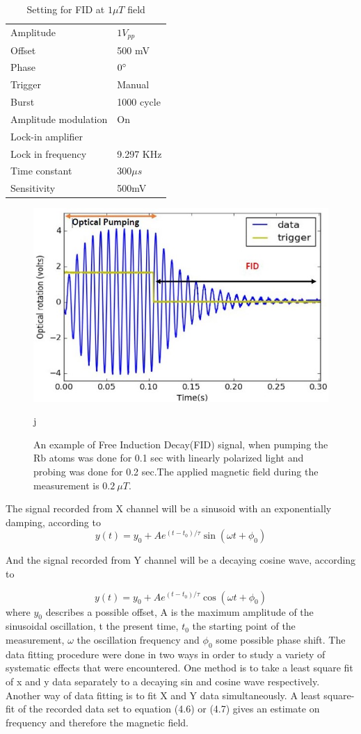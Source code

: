 \documentclass[12pt]{report}
\begin{document}
\begin{itemize}
\begin{table}[h]
\begin{tabular}{|l |l|}
Amplitude   &  $1V_{pp}$  \\
Offset  &       500 mV  \\
Phase       &    $0\degree$ \\
Trigger     &   Manual  \\
Burst       &    1000 cycle \\
Amplitude modulation & On \\
\hline
Lock-in amplifier &     \\
\hline
Lock in frequency     & 9.297 KHz \\
Time constant     &  $300\mu s$ \\
Sensitivity      &  500mV  \\
\hline
\end{tabular}
\caption{Setting for FID at $1\mu T$ field}
\end{table}
\begin{figure}[h]
\centering\includegraphics[width=0.55\linewidth]{figures/Capture2}
\caption{ An example of Free Induction Decay(FID) signal, when pumping the Rb atoms  was done for 0.1 sec with linearly polarized light and probing was done for 0.2 sec.The applied magnetic field during the measurement is $0.2~\mu T$. }j
\end{figure}
The signal recorded  from X channel will be a sinusoid with an exponentially damping, according to   
  \begin{equation}
                                         y(t) = y_0 + A   e^{(t-t_0)/\tau}\sin(\omega t + \phi_0)
\end{equation}  

And the signal recorded  from Y channel will be a decaying cosine wave, according to
                                       
  \begin{equation}
                                         y(t) = y_0 + A   e^{(t-t_0)/\tau}\cos(\omega t + \phi_0)
\end{equation}
where $y_0$ describes a possible offset, A is the maximum amplitude of the sinusoidal oscillation,
t the present time, $t_0$ the starting point of the measurement, $\omega$ the oscillation frequency and $\phi_0$  some possible phase shift. The data fitting procedure were done in two ways in order to study a variety of systematic effects that were encountered. One method is to take a least square fit of x and y data separately to a decaying sin and cosine wave respectively. Another way of data fitting is to fit X and Y data simultaneously. A least square-fit of the recorded data set to equation (4.6) or (4.7) gives an estimate on frequency and  therefore the magnetic field.
\begin{figure}
    \centering
 

\end{figure}
\end{itemize}
\end{document}
